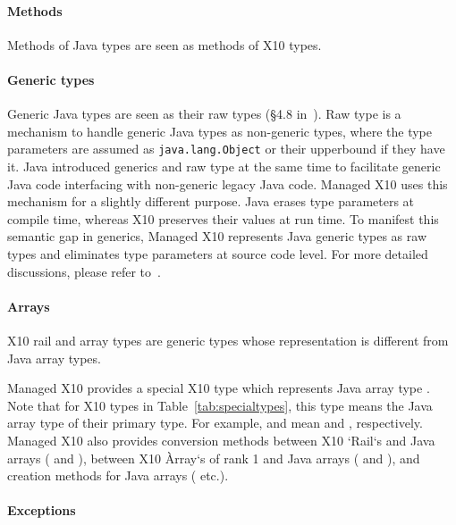 \paragraph{Methods}

Methods of Java types are seen as methods of X10 types.

\paragraph{Generic types}

Generic Java types are seen as their raw types 
(\S 4.8 in~\cite{java-lang-spec2005}).  Raw type is a mechanism to handle generic
Java types as non-generic types, where the type parameters are assumed
as \verb|java.lang.Object| or their upperbound if they have it.  Java
introduced generics and raw type at the same time to facilitate
generic Java code interfacing with non-generic legacy Java code.
Managed X10 uses this mechanism for a slightly different purpose.
Java erases type parameters at compile time, whereas X10 preserves
their values at run time.  To manifest this semantic gap in generics,
Managed X10 represents Java generic types as raw types and eliminates
type parameters at source code level.  For more detailed discussions,
please refer to~\cite{TakeuchiX1011,TakeuchiX1012}.

\paragraph{Arrays}

X10 rail and array types are generic types whose representation is different
from Java array types.

Managed X10 provides a special X10 type
 which represents Java array type
.  Note that for X10 types in Table~\ref{tab:specialtypes},
this type means the Java array type of their primary type.  For
example,  and  mean
 and , respectively.  Managed X10
also provides conversion methods between X10 \xcd`Rail`s and Java
arrays ( and
), between X10 \`Array`s 
of rank 1 and Java arrays
( and
),
and creation methods for Java arrays 
(
etc.).

\paragraph{Exceptions}

